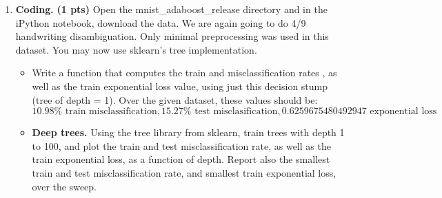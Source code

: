 \documentclass{article}
\newcommand{\mL}{\mathcal L}
\newcommand{\showpoints}[1]{\textbf{(#1 pts)}}
\begin{document}
\begin{enumerate}
\begin{enumerate}
\begin{enumerate}
\item \showpoints{0.3}  Define
\[
v_i^{(t)} = \exp\left(-y_i\left(\sum_{t'=1}^{t} \alpha^{(t')}h^{(t')}(x_i)\right)\right).
\]
Show that the sequence of $w_i^{(t)}$ and $H^{(t)}(x)$ as generated in the algorithm can be written succinctly as 
\[
w_i^{(t+1)} = \frac{v_i^{(t)}}{\sum_j v_j^{(t)}}.
\]



\item \showpoints{0.4}
Noting that $v_i \geq 0$ for all $i$, define 
\[
g(\alpha) := \sum_{i=1}^m v_i \exp(-y_i\alpha^{(t)} h^{(t)}(x_i)).
\]
 Show that $g(\alpha)$ is convex, and is minimized when  $\alpha = \alpha^{(t)}$ as defined in $(\star)$.
Hint: observe that $h^{(t)}(x_i) \neq y_i \iff y_ih^{(t)}(x_i) = -1$.




\item \showpoints{0.3} Use these two parts to argue that the $\alpha^{(t)}$ picked at each iteration is the one that greedily minimizes the loss at each iteration, e.g. satisfies $(\Delta)$. That is, show that $g(\alpha)$ is exactly the function where 
\[
g(\alpha^{(t)}) = \sum_{i=1}^m\mL(H^{(t)}(x_i);y_i).
\]


\end{enumerate}





\item \textbf{Coding.} \showpoints{1} Open the mnist\_adaboost\_release directory and in the iPython notebook, download the data. We are again going to do 4/9 handwriting disambiguation. Only minimal preprocessing was used in this dataset. You may now use sklearn's tree implementation.

\begin{itemize}
\item Write a function that computes the train and misclassification rates , as well as the train exponential loss value, using just this decision stump (tree of depth = 1). 
Over the given dataset, these values should be:
\[
10.98\% \text{ train misclassification}, 
15.27\% \text{ test misclasification},
0.6259675480492947 \text{ exponential loss}
\]


\item \textbf{Deep trees.} Using the tree library from sklearn, train trees with depth 1 to 100, and plot the train and test misclassification rate, as well as the train exponential loss, as a function of depth. Report also the smallest  train and test misclassification rate, and smallest train exponential loss, over the sweep.



\end{itemize}
\end{enumerate}
\end{enumerate}
\end{document}
